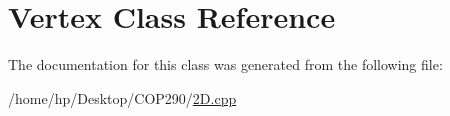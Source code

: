 \hypertarget{class_vertex}{}\section{Vertex Class Reference}
\label{class_vertex}


The documentation for this class was generated from the following file\+:\begin{DoxyCompactItemize}
\item 
/home/hp/\+Desktop/\+C\+O\+P290/\hyperlink{2_d_8cpp}{2\+D.\+cpp}\end{DoxyCompactItemize}
